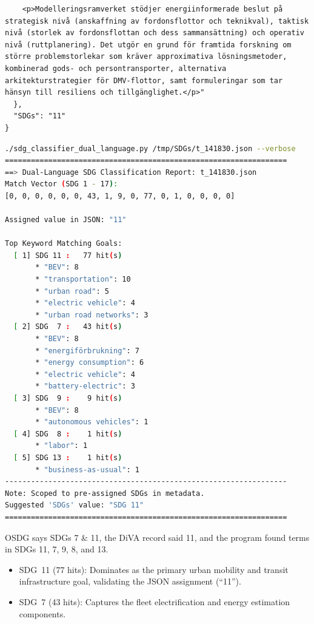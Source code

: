 \begin{casestudySection}
\begin{lstlisting}
    <p>Modelleringsramverket stödjer energiinformerade beslut på strategisk nivå (anskaffning av fordonsflottor och teknikval), taktisk nivå (storlek av fordonsflottan och dess sammansättning) och operativ nivå (ruttplanering). Det utgör en grund för framtida forskning om större problemstorlekar som kräver approximativa lösningsmetoder, kombinerad gods- och persontransporter, alternativa arkitekturstrategier för DMV-flottor, samt formuleringar som tar hänsyn till resiliens och tillgänglighet.</p>"
  },
  "SDGs": "11"
}
\end{lstlisting}

\begin{lstlisting}[language={bash}, basicstyle=\footnotesize, escapechar=|, breaklines=true,
    postbreak=\usebox{\lstbreakbox}, caption={Program's output}, label=lst:t_141830Output]
    ./sdg_classifier_dual_language.py /tmp/SDGs/t_141830.json --verbose
=================================================================
==> Dual-Language SDG Classification Report: t_141830.json
Match Vector (SDG 1 - 17):
[0, 0, 0, 0, 0, 0, 43, 1, 9, 0, 77, 0, 1, 0, 0, 0, 0]

Assigned value in JSON: "11"

Top Keyword Matching Goals:
  [ 1] SDG 11 :   77 hit(s)
       * "BEV": 8
       * "transportation": 10
       * "urban road": 5
       * "electric vehicle": 4
       * "urban road networks": 3
  [ 2] SDG  7 :   43 hit(s)
       * "BEV": 8
       * "energiförbrukning": 7
       * "energy consumption": 6
       * "electric vehicle": 4
       * "battery-electric": 3
  [ 3] SDG  9 :    9 hit(s)
       * "BEV": 8
       * "autonomous vehicles": 1
  [ 4] SDG  8 :    1 hit(s)
       * "labor": 1
  [ 5] SDG 13 :    1 hit(s)
       * "business-as-usual": 1
-----------------------------------------------------------------
Note: Scoped to pre-assigned SDGs in metadata.
Suggested 'SDGs' value: "SDG 11"
=================================================================
\end{lstlisting}

OSDG says \glspl{SDG} 7 \& 11, the \gls{DiVA} record said 11, and the program found terms in \glspl{SDG} 11, 7, 9, 8, and 13.

\begin{itemize}
    \item \gls{SDG}~11 (77 hits): Dominates as the primary urban mobility and transit infrastructure goal, validating the JSON assignment (\enquote{11}).
    
    \item \gls{SDG}~7 (43 hits): Captures the fleet electrification and energy estimation components.
    

\end{itemize}
\end{casestudySection}
